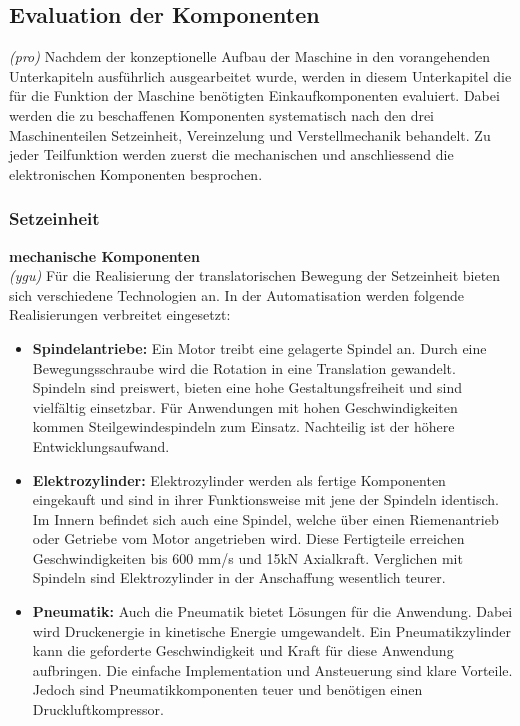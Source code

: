 \subsection{Evaluation der Komponenten} \label{kap:Evaluation_der_Komponenten}
\textit{(pro)} Nachdem der konzeptionelle Aufbau der Maschine in den vorangehenden Unterkapiteln ausführlich ausgearbeitet wurde, werden in diesem Unterkapitel die für die Funktion der Maschine benötigten Einkaufkomponenten evaluiert. Dabei werden die zu beschaffenen Komponenten systematisch nach den drei Maschinenteilen Setzeinheit, Vereinzelung und Verstellmechanik behandelt. Zu jeder Teilfunktion werden zuerst die mechanischen und anschliessend die elektronischen Komponenten besprochen.

\subsubsection{Setzeinheit} \label{subsec:Translation}
\textbf{mechanische Komponenten}\\
\textit{(ygu)} Für die Realisierung der translatorischen Bewegung der Setzeinheit bieten sich verschiedene Technologien an. In der Automatisation werden folgende Realisierungen verbreitet eingesetzt:
	\begin{itemize}
	\item \textbf{Spindelantriebe:}
	Ein Motor treibt eine gelagerte Spindel an. Durch eine Bewegungsschraube wird die Rotation in eine Translation gewandelt. Spindeln sind preiswert, bieten eine hohe Gestaltungsfreiheit und sind vielfältig einsetzbar. Für Anwendungen mit hohen Geschwindigkeiten kommen Steilgewindespindeln zum Einsatz. Nachteilig ist der höhere Entwicklungsaufwand.
	\item \textbf{Elektrozylinder:}
	Elektrozylinder werden als fertige Komponenten eingekauft und sind in ihrer Funktionsweise mit jene der Spindeln identisch. Im Innern befindet sich auch eine Spindel, welche über einen Riemenantrieb oder Getriebe vom Motor angetrieben wird. Diese Fertigteile erreichen Geschwindigkeiten bis 600 mm/s und 15kN Axialkraft. Verglichen mit Spindeln sind Elektrozylinder in der Anschaffung wesentlich teurer.
	
	\item \textbf{Pneumatik:}
	Auch die Pneumatik bietet Lösungen für die Anwendung. Dabei wird Druckenergie in kinetische Energie umgewandelt. Ein Pneumatikzylinder kann die geforderte Geschwindigkeit und Kraft für diese Anwendung aufbringen. Die einfache Implementation und Ansteuerung sind klare Vorteile. Jedoch sind Pneumatikkomponenten teuer und benötigen einen Druckluftkompressor.
	\end{itemize}

